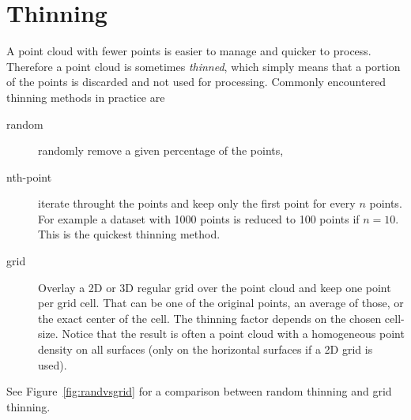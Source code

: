\section{Thinning}
A point cloud with fewer points is easier to manage and quicker to process.
Therefore a point cloud is sometimes \emph{thinned}, which simply means that a portion of the points is discarded and not used for processing.
Commonly encountered thinning methods in practice are
\begin{description}
  \item[random] randomly remove a given percentage of the points,
  \item[nth-point] iterate throught the points and keep only the first point for every $n$ points. For example a dataset with 1000 points is reduced to 100 points if $n=10$. This is the quickest thinning method.
  \item[grid] Overlay a 2D or 3D regular grid over the point cloud and keep one point per grid cell. That can be one of the original points, an average of those, or the exact center of the cell. The thinning factor depends on the chosen cell-size. Notice that the result is often a point cloud with a homogeneous point density on all surfaces (only on the horizontal surfaces if a 2D grid is used).
\end{description}
See Figure~\ref{fig:randvsgrid} for a comparison between random thinning and grid thinning.
